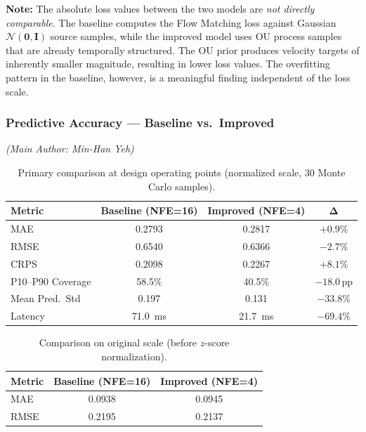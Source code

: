 \documentclass[11pt,a4paper]{article}
\begin{document}
\medskip
\noindent\textbf{Note:} The absolute loss values between the two models are
\emph{not directly comparable}.
The baseline computes the Flow Matching loss against Gaussian
$\mathcal{N}(\mathbf{0},\mathbf{I})$ source samples, while the improved model
uses OU process samples that are already temporally structured.
The OU prior produces velocity targets of inherently smaller magnitude,
resulting in lower loss values.
The overfitting pattern in the baseline, however, is a meaningful finding
independent of the loss scale.

\subsubsection{Predictive Accuracy --- Baseline vs.\ Improved}
\label{sec:accuracy}
\textit{(Main Author: Min-Han Yeh)}

\begin{table}[H]
\centering
\caption{Primary comparison at design operating points
         (normalized scale, 30 Monte Carlo samples).}
\label{tab:primary}
\begin{tabular}{@{}lccc@{}}
\toprule
\textbf{Metric} & \textbf{Baseline (NFE=16)} & \textbf{Improved (NFE=4)} & $\boldsymbol{\Delta}$ \\
\midrule
MAE              & 0.2793  & 0.2817  & $+0.9\%$   \\
RMSE             & 0.6540  & 0.6366  & $\mathbf{-2.7\%}$  \\
CRPS             & 0.2098  & 0.2267  & $+8.1\%$   \\
P10--P90 Coverage & 58.5\% & 40.5\%  & $-18.0$\,pp \\
Mean Pred.\ Std  & 0.197   & 0.131   & $-33.8\%$  \\
Latency          & \SI{71.0}{\milli\second} & \SI{21.7}{\milli\second} & $\mathbf{-69.4\%}$ \\
\bottomrule
\end{tabular}
\end{table}

\begin{table}[H]
\centering
\caption{Comparison on original scale (before $z$-score normalization).}
\label{tab:original-scale}
\begin{tabular}{@{}lcc@{}}
\toprule
\textbf{Metric} & \textbf{Baseline (NFE=16)} & \textbf{Improved (NFE=4)} \\
\midrule
MAE  & 0.0938 & 0.0945 \\
RMSE & 0.2195 & 0.2137 \\
\bottomrule
\end{tabular}
\end{table}
\end{document}
